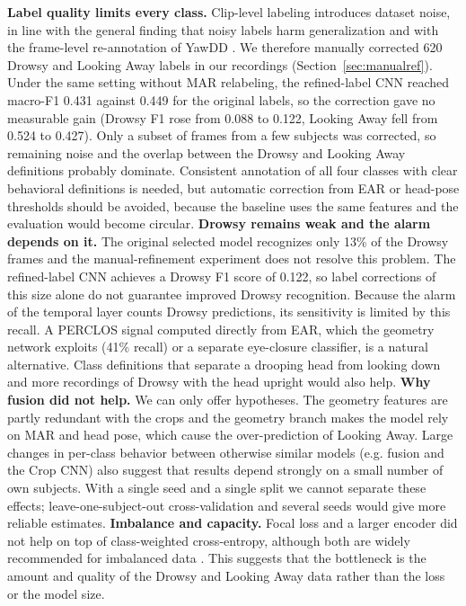 \documentclass[conference]{IEEEtran}
\begin{document}
\textbf{Label quality limits every class.} Clip-level labeling introduces dataset noise, in line with the general finding that noisy labels harm generalization \cite{song2023} and with the frame-level re-annotation of YawDD \cite{mujtaba2025}. We therefore manually corrected 620 Drowsy and Looking Away labels in our recordings (Section~\ref{sec:manualref}). Under the same setting without MAR relabeling, the refined-label CNN reached macro-F1 0.431 against 0.449 for the original labels, so the correction gave no measurable gain (Drowsy F1 rose from 0.088 to 0.122, Looking Away fell from 0.524 to 0.427). Only a subset of frames from a few subjects was corrected, so remaining noise and the overlap between the Drowsy and Looking Away definitions probably dominate. Consistent annotation of all four classes with clear behavioral definitions is needed, but automatic correction from EAR or head-pose thresholds should be avoided, because the baseline uses the same features and the evaluation would become circular.
\newline
\textbf{Drowsy remains weak and the alarm depends on it.} The original selected model recognizes only 13\% of the Drowsy frames and the manual-refinement experiment does not resolve this problem. The refined-label CNN achieves a Drowsy F1 score of 0.122, so label corrections of this size alone do not guarantee improved Drowsy recognition. Because the alarm of the temporal layer counts Drowsy predictions, its sensitivity is limited by this recall. A PERCLOS signal computed directly from EAR, which the geometry network exploits (41\% recall) or a separate eye-closure classifier, is a natural alternative. Class definitions that separate a drooping head from looking down and more recordings of Drowsy with the head upright would also help.
\newline
\textbf{Why fusion did not help.} We can only offer hypotheses. The geometry features are partly redundant with the crops and the geometry branch makes the model rely on MAR and head pose, which cause the over-prediction of Looking Away. Large changes in per-class behavior between otherwise similar models (e.g. fusion and the Crop CNN) also suggest that results depend strongly on a small number of own subjects. With a single seed and a single split we cannot separate these effects; leave-one-subject-out cross-validation and several seeds would give more reliable estimates.
\newline
\textbf{Imbalance and capacity.} Focal loss and a larger encoder did not help on top of class-weighted cross-entropy, although both are widely recommended for imbalanced data \cite{lin2017,ghosh2024}. This suggests that the bottleneck is the amount and quality of the Drowsy and Looking Away data rather than the loss or the model size.
\end{document}
